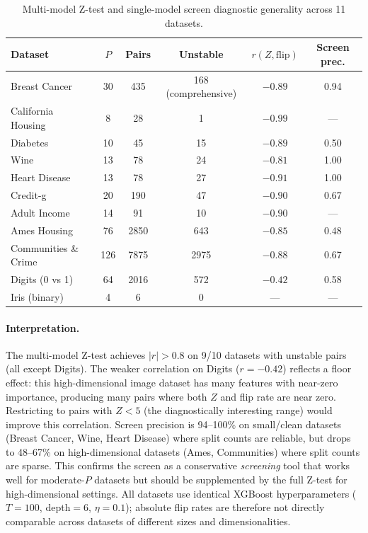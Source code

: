 \documentclass{article}
\begin{document}
\begin{table}[t]
\centering
\caption{Multi-model Z-test and single-model screen diagnostic generality across 11 datasets.}
\label{tab:f1-generality}
\small
\begin{tabular}{@{}lccccc@{}}
\toprule
Dataset & $P$ & Pairs & Unstable & $r(Z, \text{flip})$ & Screen prec. \\
\midrule
Breast Cancer & 30 & 435 & 168 (comprehensive) & $-0.89$ & 0.94 \\
California Housing & 8 & 28 & 1 & $-0.99$ & --- \\
Diabetes & 10 & 45 & 15 & $-0.89$ & 0.50 \\
Wine & 13 & 78 & 24 & $-0.81$ & 1.00 \\
Heart Disease & 13 & 78 & 27 & $-0.91$ & 1.00 \\
Credit-g & 20 & 190 & 47 & $-0.90$ & 0.67 \\
Adult Income & 14 & 91 & 10 & $-0.90$ & --- \\
Ames Housing & 76 & 2850 & 643 & $-0.85$ & 0.48 \\
Communities \& Crime & 126 & 7875 & 2975 & $-0.88$ & 0.67 \\
Digits (0 vs 1) & 64 & 2016 & 572 & $-0.42$ & 0.58 \\
Iris (binary) & 4 & 6 & 0 & --- & --- \\
\bottomrule
\end{tabular}
\end{table}

\paragraph{Interpretation.}
\begin{sloppypar}
The multi-model Z-test achieves $|r| > 0.8$ on 9/10 datasets with unstable pairs (all
except Digits). The weaker correlation on Digits ($r = -0.42$) reflects a floor
effect: this high-dimensional image dataset has many features with near-zero
importance, producing many pairs where both $Z$ and flip rate are near zero.
Restricting to pairs with $Z < 5$ (the diagnostically interesting range) would
improve this correlation. Screen precision is 94--100\% on small/clean datasets (Breast
Cancer, Wine, Heart Disease) where split counts are reliable, but drops to 48--67\%
on high-dimensional datasets (Ames, Communities) where split counts are sparse.
This confirms the screen as a conservative \emph{screening} tool that works well for
moderate-$P$ datasets but should be supplemented by the full Z-test for
high-dimensional settings. All datasets use identical XGBoost hyperparameters
($T{=}100$, depth${=}6$, $\eta{=}0.1$); absolute flip rates are therefore not
directly comparable across datasets of different sizes and dimensionalities.
\end{sloppypar}
\end{document}
